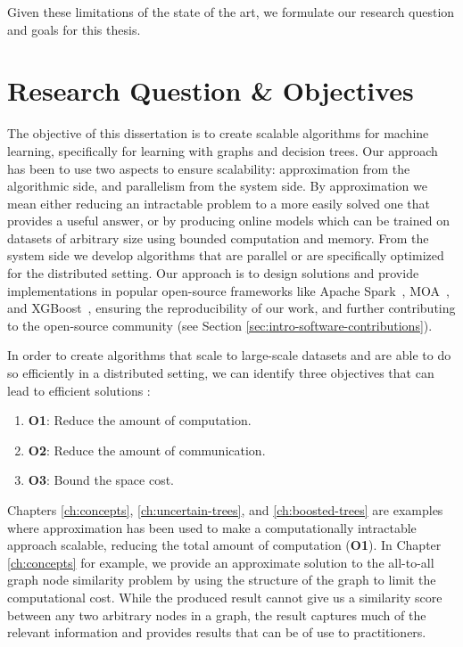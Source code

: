 Given these limitations of the state of the art, we formulate our research question and goals for
this thesis.

\section{Research Question \& Objectives}
\label{sec:intro-question-objectives}

The objective of this dissertation is to create scalable algorithms for machine
learning, specifically for learning with graphs and decision trees. Our approach has been to use two aspects to ensure scalability:
approximation from the algorithmic side, and parallelism from the system
side. By approximation we mean either reducing an intractable problem
to a more easily solved one that provides a useful answer, or by producing
online models which can be trained on datasets of arbitrary size using bounded
computation and memory. From the system side we develop algorithms that are parallel
or are specifically optimized for the distributed setting.
Our approach is to design solutions and provide implementations
in popular open-source frameworks like Apache Spark~\cite{spark},
MOA~\cite{samoa}, and XGBoost~\cite{xgboost}, ensuring the reproducibility
of our work, and further contributing to the open-source community (see Section \ref{sec:intro-software-contributions}).

In order to create algorithms that scale to large-scale datasets and are able to
do so efficiently in a distributed setting, we can identify three objectives that can
lead to efficient solutions \cite{vasia-thesis}:

\begin{enumerate}
	\item \textbf{O1}: Reduce the amount of computation.
	\item \textbf{O2}: Reduce the amount of communication.
	\item \textbf{O3}: Bound the space cost.
\end{enumerate}

Chapters \ref{ch:concepts}, \ref{ch:uncertain-trees}, and \ref{ch:boosted-trees}
are examples where approximation has been used to make a computationally intractable
approach scalable, reducing the total amount of computation (\textbf{O1}).
In Chapter \ref{ch:concepts} for example, we provide an approximate solution
to the all-to-all graph node similarity problem by using the structure of the
graph to limit the computational cost. While the produced result cannot give
us a similarity score between any two arbitrary nodes in a graph, the result captures
much of the relevant information and provides results that can be of use
to practitioners.

